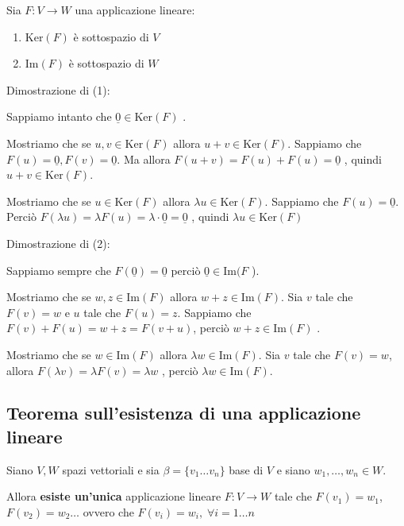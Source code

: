 \documentclass[
  a4paper,
]{article}
\providecommand{\tightlist}{%
  \setlength{\itemsep}{0pt}\setlength{\parskip}{0pt}}
\providecommand{\tightlist}{}
\begin{document}
\begin{propositionbox}
Sia \(F: V \to W\) una applicazione lineare:

\begin{enumerate}
\def\labelenumi{\arabic{enumi}.}
\tightlist
\item
  \(\text{Ker}(F)\) è sottospazio di \(V\)
\item
  \(\text{Im}(F)\) è sottospazio di \(W\)
\end{enumerate}
\end{propositionbox}

\begin{proofbox}
Dimostrazione di (1):

Sappiamo intanto che \(\underline{0} \in \text{Ker}(F)\) .

Mostriamo che se \(u, v \in\text{Ker}(F)\) allora
\(u + v \in \text{Ker}(F)\). Sappiamo che
\(F(u) = \underline{0}, F(v) = \underline{0}\). Ma allora
\(F(u+v) = F(u) + F(u) = \underline{0}\) , quindi
\(u + v \in \text{Ker}(F)\).

Mostriamo che se \(u \in \text{Ker}(F)\) allora
\(\lambda u \in \text{Ker}(F)\). Sappiamo che \(F(u) = \underline{0}\).
Perciò
\(F(\lambda u) = \lambda F(u) = \lambda \cdot \underline{0} = \underline{0}\)
, quindi \(\lambda u \in \text{Ker}(F)\)

\bigskip

Dimostrazione di (2):

Sappiamo sempre che \(F(\underline{0}) = \underline{0}\) perciò
\(\underline{0} \in \text{Im}(F\) ).

Mostriamo che se \(w, z \in\text{Im}(F)\) allora
\(w + z \in \text{Im}(F)\). Sia \(v\) tale che \(F(v) = w\) e \(u\) tale
che \(F(u) = z\). Sappiamo che \(F(v) + F(u) = w + z = F(v + u)\),
perciò \(w + z \in \text{Im}(F)\) .

Mostriamo che se \(w \in\text{Im}(F)\) allora
\(\lambda w \in \text{Im}(F)\). Sia \(v\) tale che \(F(v) = w\), allora
\(F(\lambda v) = \lambda F(v) = \lambda w\) , perciò
\(\lambda w \in \text{Im}(F)\).
\end{proofbox}

\hypertarget{teorema-sullesistenza-di-una-applicazione-lineare}{%
\subsection{Teorema sull'esistenza di una applicazione
lineare}\label{teorema-sullesistenza-di-una-applicazione-lineare}}

\begin{teoremabox}
Siano \(V, W\) spazi vettoriali e sia \(\beta = \{v_1 \dots v_n\}\) base
di \(V\) e siano \(w_1, \dots, w_n \in W\).

Allora \textbf{esiste un'unica} applicazione lineare \(F: V \to W\) tale
che \(F(v_1) = w_1\), \(F(v_2) = w_2 \dots\) ovvero che
\(F(v_i) = w_i, \; \forall i = 1 \dots n\)
\end{teoremabox}
\end{document}
